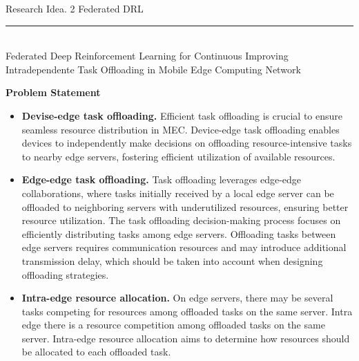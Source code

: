 \documentclass[12pt]{article}
\begin{document}
\newpage



\begin{center} 
	
	
	\vspace{-17mm}
	
	\large Research Idea. 2  \hfill Federated DRL \vspace{1mm} \hrule
	
	\vspace{-1mm}
	
	
	
	
	\textcolor{white}{i} \\ \LARGE Federated Deep Reinforcement Learning for Continuous Improving Intradependente Task Offloading in Mobile Edge Computing Network\vspace{6mm}\\
	
\end{center}


\vspace{1mm}

\noindent\textbf{\large Problem Statement}

\begin{itemize}
	
	\item \textbf{Devise-edge task offloading.}
	Efficient task offloading is crucial to ensure seamless resource distribution in MEC. Device-edge task offloading enables devices to independently make decisions on offloading resource-intensive tasks to nearby edge servers, fostering efficient utilization of available resources.
	
	\item\textbf{Edge-edge task offloading.} 
	Task offloading leverages edge-edge collaborations, where tasks initially received by a local edge server can be offloaded to neighboring servers with underutilized resources, ensuring better resource utilization. The task offloading decision-making process focuses on efficiently distributing tasks among edge servers. Offloading tasks between edge servers requires communication resources and may introduce additional transmission delay, which should be taken into account when designing offloading strategies.
	
	\item\textbf{Intra-edge resource allocation.} On edge servers, there may be several tasks competing for resources among offloaded tasks on the same server. Intra edge there is a resource competition among offloaded tasks on the same server. Intra-edge resource allocation aims to determine how resources should be allocated to each offloaded task.
	
\end{itemize}
\end{document}
